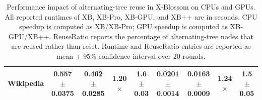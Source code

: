 \begin{table}[h]
{\begin{tabular}{l|cccc|cccc}
 Wikipedia & 0.557 {\tiny $\pm$ 0.0375} & 0.462 {\tiny $\pm$ 0.0285} & 1.20$\times$ & 1.6 {\tiny $\pm$ 0.03} & 0.0201 {\tiny $\pm$ 0.0014} & 0.0163 {\tiny $\pm$ 0.0009} & 1.24$\times$ & 1.5 {\tiny $\pm$ 0.05} \\
 \bottomrule
 \end{tabular}
 }
 \captionsetup{skip=4pt}
 \caption{
 Performance impact of alternating-tree reuse in X-Blossom on CPUs and GPUs.
 All reported runtimes of XB, XB-Pro, XB-GPU, and XB++ are in seconds.
 CPU speedup is computed as XB/XB-Pro; GPU speedup is computed as XB-GPU/XB++.
 ReuseRatio reports the percentage of alternating-tree nodes that are reused rather than reset.
 Runtime and ReuseRatio entries are reported as mean $\pm$ 95\% confidence interval over 20 rounds.
 }
 \label{tab:reuse}
\vspace{-4pt}
\end{table}
